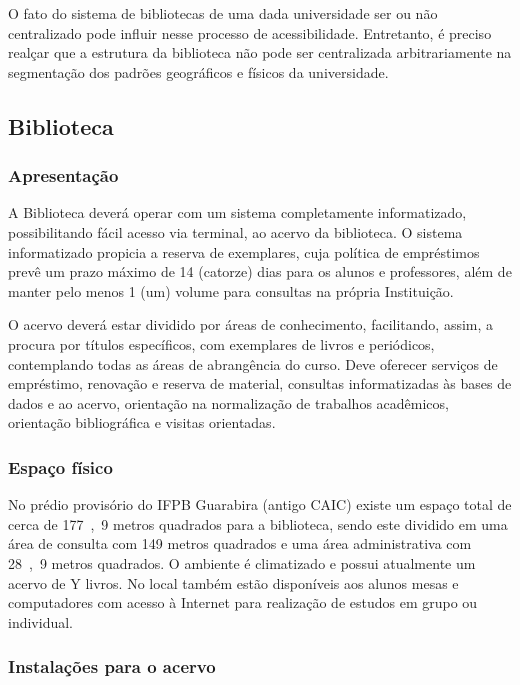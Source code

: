 	O fato do sistema de bibliotecas de uma dada universidade ser ou não centralizado pode influir nesse processo de acessibilidade. Entretanto, é preciso realçar que a estrutura da biblioteca não pode ser centralizada arbitrariamente na segmentação dos padrões geográficos e físicos da universidade.


\subsection{Biblioteca}

\subsubsection{Apresenta\c{c}\~ao}

A Biblioteca deverá operar com um sistema completamente informatizado, possibilitando fácil acesso via terminal, ao acervo da biblioteca. O sistema informatizado propicia a reserva de exemplares, cuja política de empréstimos prevê um prazo máximo de 14 (catorze) dias para os alunos e professores, além de manter pelo menos 1 (um) volume para consultas na própria Instituição.

O acervo deverá estar dividido por áreas de conhecimento, facilitando, assim, a procura por títulos específicos, com exemplares de livros e periódicos, contemplando todas as áreas de abrangência do curso. Deve oferecer serviços de empréstimo, renovação e reserva de material, consultas informatizadas às bases de dados e ao acervo, orientação na normalização de trabalhos acadêmicos, orientação bibliográfica e visitas orientadas.

\subsubsection{Espa\c{c}o f\'isico}

No pr\'edio provis\'orio do IFPB Guarabira (antigo CAIC) existe um espaço total de cerca de \unit{177,9} metros quadrados para a biblioteca, sendo este dividido em uma área de consulta com \unit{149} metros quadrados e uma área administrativa com \unit{28,9} metros quadrados. O ambiente \'e climatizado e possui atualmente um acervo de Y livros. No local também estão disponíveis aos alunos mesas e computadores com acesso \`a Internet para realiza\c{c}\~ao de estudos em grupo ou individual.

\subsubsection{Instala\c{c}\~oes para o acervo}

